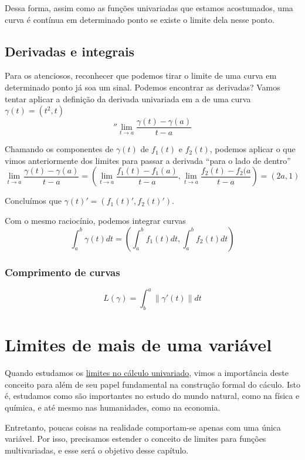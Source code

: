 \documentclass[
  portuguese,
  letterpaper,
  DIV=11,
  numbers=noendperiod]{scrreport}
\begin{document}
Dessa forma, assim como as funções univariadas que estamos acostumados,
uma curva é contínua em determinado ponto se existe o limite dela nesse
ponto.

\section{Derivadas e integrais}\label{derivadas-e-integrais}

Para os atenciosos, reconhecer que podemos tirar o limite de uma curva
em determinado ponto já soa um sinal. Podemos encontrar as derivadas?
Vamos tentar aplicar a definição da derivada univariada em a de uma
curva \(\gamma(t) = (t^2, t)\) \[''
\lim_{t\rightarrow a} \frac{\gamma(t)-\gamma(a)}{t-a}
\]

Chamando os componentes de \(\gamma(t)\) de \(f_{1}(t)\) e \(f_{2}(t)\),
podemos aplicar o que vimos anteriormente dos limites para passar a
derivada ``para o lado de dentro'' \[
\lim_{t\rightarrow a} \frac{\gamma(t) - \gamma(a)}{t-a} = \left(\lim_{t \rightarrow a} \frac{f_{1}(t) - f_{1}(a)}{t-a},
\lim_{t \rightarrow a}\frac{f_{2}(t)-f_{2}(a}{t-a} \right) = (2a, 1)
\]

Concluímos que \(\gamma(t)' = (f_{1}(t)', f_{2}(t)')\).

Com o mesmo raciocínio, podemos integrar curvas \[
\int_{a}^{b} \gamma(t)dt = \left(\int_{a}^{b} f_{1}(t)dt, \int_{a}^{b}f_{2}(t)dt\right)
\]

\subsection{Comprimento de curvas}\label{comprimento-de-curvas}

\[
L(\gamma) = \int^{a}_{b} \lVert \gamma'(t) \rVert dt
\]

\chapter{Limites de mais de uma
variável}\label{limites-de-mais-de-uma-variuxe1vel}

Quando estudamos os \hyperref[limites]{limites no cálculo univariado},
vimos a importância deste conceito para além de seu papel fundamental na
construção formal do cáculo. Isto é, estudamos como são importantes no
estudo do mundo natural, como na física e química, e até mesmo nas
humanidades, como na economia.

Entretanto, poucas coisas na realidade comportam-se apenas com uma única
variável. Por isso, precisamos estender o conceito de limites para
funções multivariadas, e esse será o objetivo desse capítulo.
\end{document}
